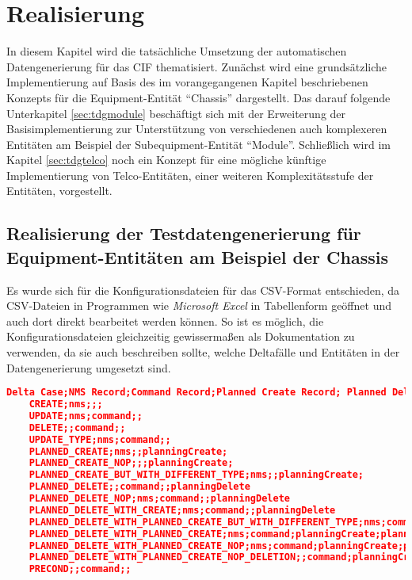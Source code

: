 \chapter{Realisierung}\label{ch:realisierung}
In diesem Kapitel wird die tatsächliche Umsetzung der automatischen Datengenerierung für das \ac{CIF} thematisiert. Zunächst wird eine grundsätzliche Implementierung auf Basis des im vorangegangenen Kapitel beschriebenen Konzepts für die Equipment-Entität \enquote{Chassis} dargestellt. Das darauf folgende Unterkapitel \ref{sec:tdgmodule} beschäftigt sich mit der Erweiterung der Basisimplementierung zur Unterstützung von verschiedenen auch komplexeren Entitäten am Beispiel der Subequipment-Entität \enquote{Module}. Schließlich wird im Kapitel \ref{sec:tdgtelco} noch ein Konzept für eine mögliche künftige Implementierung von Telco-Entitäten, einer weiteren Komplexitätsstufe der Entitäten, vorgestellt.

\section{Realisierung der Testdatengenerierung für Equipment-Entitäten am Beispiel der Chassis}\label{sec:tdgchassis}


Es wurde sich für die Konfigurationsdateien für das \ac{CSV}-Format entschieden, da \ac{CSV}-Dateien in Programmen wie \textit{Microsoft Excel} in Tabellenform geöffnet und auch dort direkt bearbeitet werden können. \cite{excel:2022} So ist es möglich, die Konfigurationsdateien gleichzeitig gewissermaßen als Dokumentation zu verwenden, da sie auch beschreiben sollte, welche Deltafälle und Entitäten in der Datengenerierung umgesetzt sind.


\begin{lstlisting}[caption=Konfigurationsdatei für Deltafälle im CSV-Format, label=Delta-Spezifikationen,language=json]
    Delta Case;NMS Record;Command Record;Planned Create Record; Planned Delete Record
    CREATE;nms;;;
    UPDATE;nms;command;;
    DELETE;;command;;
    UPDATE_TYPE;nms;command;;
    PLANNED_CREATE;nms;;planningCreate;
    PLANNED_CREATE_NOP;;;planningCreate;
    PLANNED_CREATE_BUT_WITH_DIFFERENT_TYPE;nms;;planningCreate;
    PLANNED_DELETE;;command;;planningDelete
    PLANNED_DELETE_NOP;nms;command;;planningDelete
    PLANNED_DELETE_WITH_CREATE;nms;command;;planningDelete
    PLANNED_DELETE_WITH_PLANNED_CREATE_BUT_WITH_DIFFERENT_TYPE;nms;command;planningCreate;planningDelete
    PLANNED_DELETE_WITH_PLANNED_CREATE;nms;command;planningCreate;planningDelete
    PLANNED_DELETE_WITH_PLANNED_CREATE_NOP;nms;command;planningCreate;planningDelete
    PLANNED_DELETE_WITH_PLANNED_CREATE_NOP_DELETION;;command;planningCreate;planningDelete
    PRECOND;;command;;
\end{lstlisting}

